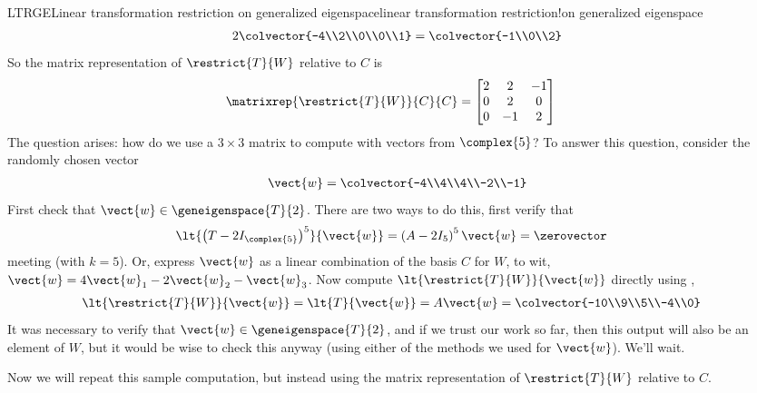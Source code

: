 \begin{example}{LTRGE}{Linear transformation restriction on generalized eigenspace}{linear transformation restriction!on generalized eigenspace}
\begin{align*}
{2\colvector{-4\\2\\0\\0\\1}
}
=\colvector{-1\\0\\2}\\
%
\end{align*}
%
So the matrix representation of $\restrict{T}{W}$ relative to $C$ is
%
\begin{align*}
\matrixrep{\restrict{T}{W}}{C}{C}&=
\begin{bmatrix}
2 & 2 & -1\\
0 & 2 & 0\\
0 & -1 & 2
\end{bmatrix}
\end{align*}
%
The question arises:  how do we use a $3\times 3$ matrix to compute with vectors from $\complex{5}$?  To answer this question, consider the randomly chosen vector
%
\begin{align*}
\vect{w}=\colvector{-4\\4\\4\\-2\\-1}
\end{align*}
%
First check that $\vect{w}\in\geneigenspace{T}{2}$.  There are two ways to do this, first verify that 
%
\begin{align*}
\lt{\left(T-2I_{\complex{5}}\right)^5}{\vect{w}}
&=\left(A-2I_5\right)^5\vect{w}=\zerovector
\end{align*}
%
meeting  (with $k=5$).  Or, express $\vect{w}$ as a linear combination of the basis $C$ for $W$, to wit, $\vect{w}=4\vect{w}_1-2\vect{w}_2-\vect{w}_3$.  Now compute $\lt{\restrict{T}{W}}{\vect{w}}$ directly using , 
%
\begin{align*}
\lt{\restrict{T}{W}}{\vect{w}}
&=\lt{T}{\vect{w}}
=A\vect{w}
=\colvector{-10\\9\\5\\-4\\0}
\end{align*}
%
It was necessary to verify that $\vect{w}\in\geneigenspace{T}{2}$, and if we trust our work so far, then this output will also be an element of $W$, but it would be wise to check this anyway (using either of the methods we used for $\vect{w}$).  We'll wait.\par
%
Now we will repeat this sample computation, but instead using the matrix representation of $\restrict{T}{W}$ relative to $C$.

\end{example}
